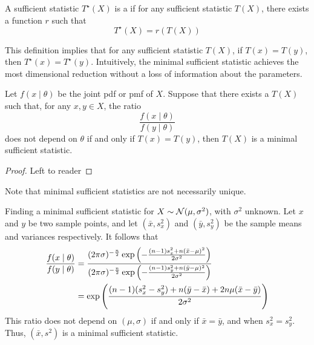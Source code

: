 \documentclass[10pt]{article}
\begin{document}
\begin{definition}
	A sufficient statistic $T^\star(X)$ is a  if for any sufficient statistic $T(X)$, there exists a function $r$ such that
	\[
	T^\star(X) = r(T(X))
	\]
\end{definition}

This definition implies that for any sufficient statistic $T(X)$, if $T(x) = T(y)$, then $T^\star(x) = T^\star(y)$. Intuitively, the minimal sufficient statistic achieves the most dimensional reduction without a loss of information about the parameters.

\begin{theorem}
	Let $f(x \mid \theta)$ be the joint pdf or pmf of $X$. Suppose that there exists a $T(X)$ such that, for any $x,y \in X$, the ratio 
	\[
	\frac{f(x \mid \theta)}{f(y \mid \theta)}
	\]
	does not depend on $\theta$ if and only if $T(x) = T(y)$, then $T(X)$ is a minimal sufficient statistic.
\end{theorem}
\begin{proof}
	Left to reader
\end{proof}

\begin{remark}
	Note that minimal sufficient statistics are not necessarily unique.
\end{remark}

\begin{example}
	Finding a minimal sufficient statistic for $X \sim \mathcal{N}(\mu,\sigma^2)$, with $\sigma^2$ unknown. Let $x$ and $y$ be two sample points, and let $(\bar{x},s_x^2)$ and $(\bar{y},s_y^2)$ be the sample means and variances respectively. It follows that
	\begin{align*}
		\frac{f(x \mid \theta)}{f(y \mid \theta)	} &= \frac{(2\pi\sigma)^{-\frac{n}{2}} \exp \left( - \frac{(n-1)s_x^2 + n(\bar{x} - \mu)^2}{2\sigma^2} \right) }{(2\pi\sigma)^{-\frac{n}{2}} \exp \left( - \frac{(n-1)s_y^2 + n(\bar{y} - \mu)^2}{2\sigma^2} \right) } \\
		&= \exp \left( \frac{(n-1)(s_x^2 - s_y^2) + n (\bar{y} - \bar{x}) + 2n\mu (\bar{x} - \bar{y})}{2\sigma^2} \right)
	\end{align*}
	This ratio does not depend on $(\mu,\sigma)$ if and only if $\bar{x} = \bar{y}$, and when $s^2_x = s^2_y$. Thus, $(\bar{x},s^2)$ is a minimal sufficient statistic.
\end{example}
\end{document}
